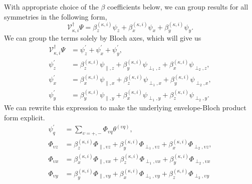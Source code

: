 With appropriate choice of the $\beta$ coefficients below, we can group results for all symmetries in the following form,
\begin{equation}
  \mathcal{V}_{\kappa,i}^{\dagger}
  \Psi
  =
  \beta_{z}^{\left(\kappa,i\right)}\psi_{z}
  +
  \beta_{x}^{\left(\kappa,i\right)}\psi_{x}
  +
  \beta_{y}^{\left(\kappa,i\right)}\psi_{y}.
\label{multi-term_form}
\end{equation}
We can group the terms solely by Bloch axes, which will give us 
\begin{align}
  \mathcal{V}_{\kappa,i}^{\dagger}
  \Psi
  &=
  \psi_{z}^{\prime} + \psi_{x}^{\prime} + \psi_{y}^{\prime},
\label{single-term:form-b}
\\
  \psi_{z}^{\prime}
  &=
  \beta_{z}^{\left(\kappa,i\right)}\psi_{\parallel,z}
  +
  \beta_{y}^{\left(\kappa,i\right)}\psi_{\perp_{1},z}
  +
  \beta_{x}^{\left(\kappa,i\right)}\psi_{\perp_{2},z}
  ,
\label{single-axis:form:z}
\\
  \psi_{x}^{\prime}
  &=
  \beta_{x}^{\left(\kappa,i\right)}\psi_{\parallel,x}
  +
  \beta_{z}^{\left(\kappa,i\right)}\psi_{\perp_{1},x}
  +
  \beta_{y}^{\left(\kappa,i\right)}\psi_{\perp_{2},x}
  ,
\label{single-axis:form:x}
\\
  \psi_{y}^{\prime}
  &=
  \beta_{y}^{\left(\kappa,i\right)}\psi_{\parallel,y}
  +
  \beta_{x}^{\left(\kappa,i\right)}\psi_{\perp_{1},y}
  +
  \beta_{z}^{\left(\kappa,i\right)}\psi_{\perp_{2},y}
  .
\label{single-axis:form:y}
\end{align}
We can rewrite this expression to make the underlying envelope-Bloch product
form explicit.
\begin{align}
\psi_{q}^{\prime}
  &=
    \sum_{\upsilon = +,-}
    \Phi_{\upsilon q}
    \theta^{\left(\upsilon q\right)}
,
\label{single-axis:form1}
\\
  \Phi_{\upsilon z}
  & =
  \beta_{z}^{\left(\kappa,i\right)}\Phi_{\parallel,\upsilon z}
  +
  \beta_{y}^{\left(\kappa,i\right)}\Phi_{\perp_{1},\upsilon z}
  +
  \beta_{x}^{\left(\kappa,i\right)}\Phi_{\perp_{2},\upsilon z},
\\
  \Phi_{\upsilon x}
  & =
  \beta_{x}^{\left(\kappa,i\right)}\Phi_{\parallel,\upsilon x}
  +
  \beta_{z}^{\left(\kappa,i\right)}\Phi_{\perp_{1},\upsilon x}
  +
  \beta_{y}^{\left(\kappa,i\right)}\Phi_{\perp_{2},\upsilon x}
\\
  \Phi_{\upsilon y}
  & =
  \beta_{y}^{\left(\kappa,i\right)}\Phi_{\parallel,\upsilon y}
  +
  \beta_{x}^{\left(\kappa,i\right)}\Phi_{\perp_{1},\upsilon y}
  +
  \beta_{z}^{\left(\kappa,i\right)}\Phi_{\perp_{2},\upsilon y}
\end{align}
